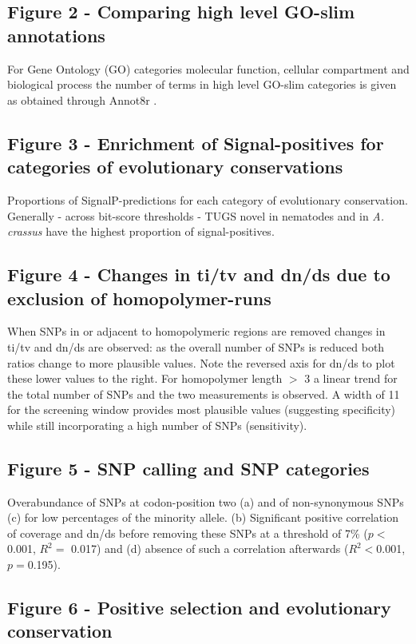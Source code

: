 \documentclass[10pt]{bmc_article}
\newenvironment{bmcformat}{\begin{raggedright}\baselineskip20pt\sloppy\setboolean{publ}{false}}{\end{raggedright}\baselineskip20pt\sloppy}
\begin{document}
\begin{bmcformat}
\subsection*{Figure 2 - Comparing high level GO-slim annotations}

For Gene Ontology (GO) categories molecular function, cellular
compartment and biological process the number of terms in high level
GO-slim categories is given as obtained through Annot8r
\cite{schmid_annot8r:_2008}.

\subsection*{Figure 3 - Enrichment of Signal-positives for categories
  of evolutionary conservations}

Proportions of SignalP-predictions for each category of evolutionary
conservation. Generally - across bit-score thresholds - TUGS novel in
nematodes and in \textit{A. crassus} have the highest proportion of
signal-positives.


\subsection*{Figure 4 - Changes in ti/tv and dn/ds due to exclusion of
  homopolymer-runs}

When SNPs in or adjacent to homopolymeric regions are removed changes
in ti/tv and dn/ds are observed: as the overall number of SNPs is
reduced both ratios change to more plausible values. Note the reversed
axis for dn/ds to plot these lower values to the right. For
homopolymer length $>$ 3 a linear trend for the total number of SNPs
and the two measurements is observed. A width of 11 for the screening
window provides most plausible values (suggesting specificity) while
still incorporating a high number of SNPs (sensitivity).

\subsection*{Figure 5 - SNP calling and SNP categories}
 
Overabundance of SNPs at codon-position two (a) and of non-synonymous
SNPs (c) for low percentages of the minority allele. (b) Significant
positive correlation of coverage and dn/ds before removing these SNPs
at a threshold of 7\% ($p<$ 0.001, $R^2=$
0.017) and (d) absence of such a
correlation afterwards ($R^2<$0.001,
$p=$0.195).


\subsection*{Figure 6 - Positive selection and evolutionary
  conservation}


\end{bmcformat}
\end{document}
